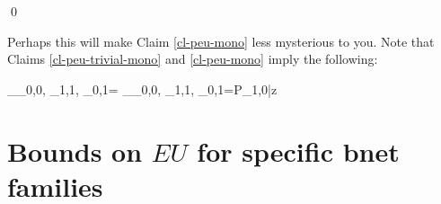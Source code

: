 \qed

Perhaps this will make Claim \ref{cl-peu-mono}
less mysterious to you.
Note that Claims \ref{cl-peu-trivial-mono}
and \ref{cl-peu-mono} imply the following: 

\beq
{}
_{\alp_{0,0}, \alp_{1,1}, \alp_{0,1}}=
_{\alp_{0,0}, \alp_{1,1}, \alp_{0,1}}=P_{1,0|z}
\eeq


\section{Bounds on $EU$
for specific bnet  families}

%
%
%
%
%
%
%
%
%
